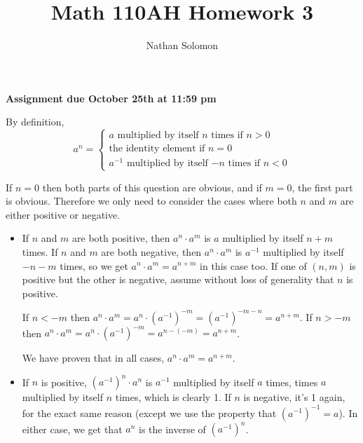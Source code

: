\documentclass[12pt]{article}
\begin{document}
\title{Math 110AH Homework 3}
\author{Nathan Solomon}
\maketitle

\textbf{Assignment due October 25th at 11:59 pm}

\bigskip
\noindent{}\bigskip

By definition,
\[ a^n = \begin{cases}
    \text{$a$ multiplied by itself $n$ times if $n > 0$} \\
    \text{the identity element if $n = 0$} \\
    \text{$a^{-1}$ multiplied by itself $-n$ times if $n < 0$}
\end{cases} \]

If $n=0$ then both parts of this question are obvious, and if $m=0$, the first part is obvious. Therefore we only need to consider the cases where both $n$ and $m$ are either positive or negative.

\begin{itemize}
    \item If $n$ and $m$ are both positive, then $a^n \cdot a^m$ is $a$ multiplied by itself $n+m$ times. If $n$ and $m$ are both negative, then $a^n \cdot a^m$ is $a^{-1}$ multiplied by itself $-n-m$ times, so we get $a^n \cdot a^m = a^{n+m}$ in this case too. If one of $(n, m)$ is positive but the other is negative, assume without loss of generality that $n$ is positive.
        \par
        If $n < -m$ then $a^n \cdot a^m = a^n \cdot (a^{-1})^{-m} = (a^{-1})^{-m-n} = a^{n+m}$. If $n > -m$ then $a^n \cdot a^m = a^n \cdot (a^{-1})^{-m} = a^{n-(-m)} = a^{n+m}$.
        \par
        We have proven that in all cases, $a^n \cdot a^m = a^{n+m}$.
    \item If $n$ is positive, $(a^{-1})^n \cdot a^n$ is $a^{-1}$ multiplied by itself $a$ times, times $a$ multiplied by itself $n$ times, which is clearly 1. If $n$ is negative, it's 1 again, for the exact same reason (except we use the property that $(a^{-1})^{-1} = a$). In either case, we get that $a^n$ is the inverse of $(a^{-1})^n$.
\end{itemize}

\bigskip
\noindent{}\bigskip
\end{document}
